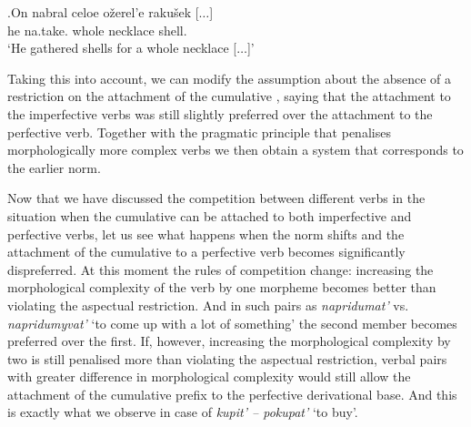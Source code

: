 \exg.\label{ex:nabrat}On nabral celoe o\v{z}erel'e raku\v{s}ek [$\ldots$]\\
he na.take. whole necklace shell.\\
\trans `He gathered shells for a whole necklace [$\ldots$]'\\

Taking this into account, we can modify the assumption about the absence of a restriction on the attachment of the cumulative , saying that the attachment to the imperfective verbs was still slightly preferred over the attachment to the perfective verb. Together with the pragmatic principle that penalises morphologically more complex verbs we then obtain a system that corresponds to the earlier norm. 

Now that we have discussed the competition between different verbs in the situation when the cumulative  can be attached to both imperfective and perfective verbs, let us see what happens when the norm shifts and the attachment of the cumulative  to a perfective verb becomes significantly dispreferred. At this moment the rules of competition change: increasing the morphological complexity of the verb by one morpheme becomes better than violating the aspectual restriction. And in such pairs as \textit{napridumat'} vs. \textit{napridumyvat'} `to come up with a lot of something' the second member becomes preferred over the first. If, however, increasing the morphological complexity by two is still penalised more than violating the aspectual restriction, verbal pairs with greater difference in morphological complexity would still allow the attachment of the cumulative prefix  to the perfective derivational base. And this is exactly what we observe in case of \textit{kupit' -- pokupat'} `to buy'.

